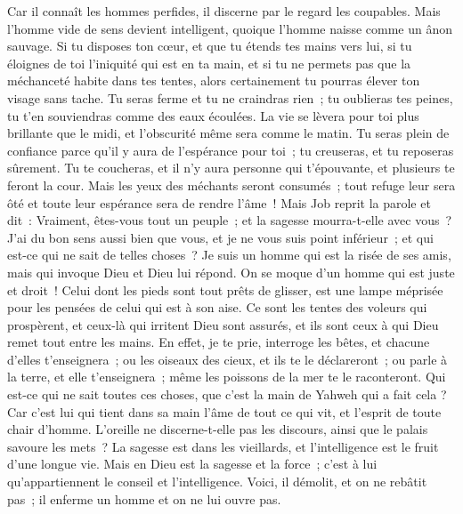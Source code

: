 \begin{multicols}{2}
Car il connaît les hommes perfides, il discerne par le regard les coupables.
Mais l'homme vide de sens devient intelligent, quoique l'homme naisse comme un ânon sauvage.
Si tu disposes ton cœur, et que tu étends tes mains vers lui,
si tu éloignes de toi l'iniquité qui est en ta main, et si tu ne permets pas que la méchanceté habite dans tes tentes,
alors certainement tu pourras élever ton visage sans tache. Tu seras ferme et tu ne craindras rien~;
tu oublieras tes peines, tu t'en souviendras comme des eaux écoulées.
La vie se lèvera pour toi plus brillante que le midi, et l'obscurité même sera comme le matin.
 Tu seras plein de confiance parce qu'il y aura de l'espérance pour toi~; tu creuseras, et tu reposeras sûrement.
Tu te coucheras, et il n'y aura personne qui t'épouvante, et plusieurs te feront la cour.
Mais les yeux des méchants seront consumés~; tout refuge leur sera ôté et toute leur espérance sera de rendre l'âme~!
\VerseOne{}Mais Job reprit la parole et dit~:
Vraiment, êtes-vous tout un peuple~; et la sagesse mourra-t-elle avec vous~?
J'ai du bon sens aussi bien que vous, et je ne vous suis point inférieur~; et qui est-ce qui ne sait de telles choses~?
Je suis un homme qui est la risée de ses amis, mais qui invoque Dieu et Dieu lui répond. On se moque d'un homme qui est juste et droit~!
 Celui dont les pieds sont tout prêts de glisser, est une lampe méprisée pour les pensées de celui qui est à son aise.
Ce sont les tentes des voleurs qui prospèrent, et ceux-là qui irritent Dieu sont assurés, et ils sont ceux à qui Dieu remet tout entre les mains.
En effet, je te prie, interroge les bêtes, et chacune d'elles t'enseignera~; ou les oiseaux des cieux, et ils te le déclareront~;
ou parle à la terre, et elle t'enseignera~; même les poissons de la mer te le raconteront.
Qui est-ce qui ne sait toutes ces choses, que c'est la main de Yahweh qui a fait cela ?
Car c'est lui qui tient dans sa main l'âme de tout ce qui vit, et l'esprit de toute chair d'homme.
L'oreille ne discerne-t-elle pas les discours, ainsi que le palais savoure les mets~?
La sagesse est dans les vieillards, et l'intelligence est le fruit d'une longue vie.
Mais en Dieu est la sagesse et la force~; c'est à lui qu'appartiennent le conseil et l'intelligence.
Voici, il démolit, et on ne rebâtit pas~; il enferme un homme et on ne lui ouvre pas.

\end{multicols}
